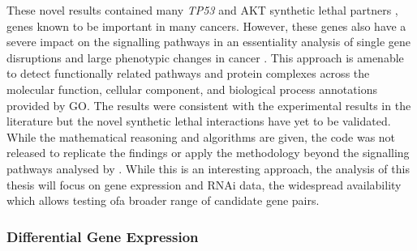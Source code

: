 These novel results contained many \textit{TP53} and AKT \gls{synthetic lethal} partners \citep{Zhang2015}, genes known to be important in many cancers. However, these genes also have a severe impact on the signalling \glspl{pathway} in an essentiality analysis of single gene disruptions and large phenotypic changes in cancer \citep{Zhang2015}. This approach is amenable to detect functionally related \glspl{pathway} and protein complexes across the molecular function, cellular component, and biological process annotations provided by \acrlong{GO}. The results were consistent with the experimental results in the literature but the novel \gls{synthetic lethal} interactions have yet to be validated. While the mathematical reasoning and algorithms are given, the code was not released to replicate the findings or apply the methodology beyond the signalling pathways analysed by \citep{Zhang2015}. While this is an interesting approach, the analysis of this thesis will focus on \gls{gene expression} and \gls{RNAi} data, the widespread availability which allows testing ofa broader range of candidate gene pairs.


\subsubsection{Differential Gene Expression}

